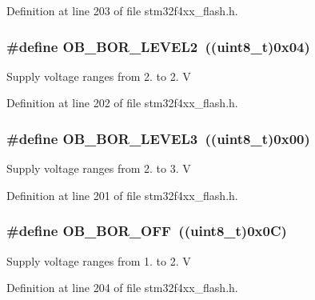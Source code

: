 Definition at line 203 of file stm32f4xx\-\_\-flash.\-h.

\hypertarget{group___f_l_a_s_h___b_o_r___reset___level_gad678e849fcf817f6ed2d837538e8ebc2}{
\subsubsection[{O\-B\-\_\-\-B\-O\-R\-\_\-\-L\-E\-V\-E\-L2}]{\setlength{\rightskip}{0pt plus 5cm}\#define O\-B\-\_\-\-B\-O\-R\-\_\-\-L\-E\-V\-E\-L2~((uint8\-\_\-t)0x04)}}\label{group___f_l_a_s_h___b_o_r___reset___level_gad678e849fcf817f6ed2d837538e8ebc2}
Supply voltage ranges from 2. to 2. V 

Definition at line 202 of file stm32f4xx\-\_\-flash.\-h.

\hypertarget{group___f_l_a_s_h___b_o_r___reset___level_ga3132b8202c0a345e9dd33d136714b046}{
\subsubsection[{O\-B\-\_\-\-B\-O\-R\-\_\-\-L\-E\-V\-E\-L3}]{\setlength{\rightskip}{0pt plus 5cm}\#define O\-B\-\_\-\-B\-O\-R\-\_\-\-L\-E\-V\-E\-L3~((uint8\-\_\-t)0x00)}}\label{group___f_l_a_s_h___b_o_r___reset___level_ga3132b8202c0a345e9dd33d136714b046}
Supply voltage ranges from 2. to 3. V 

Definition at line 201 of file stm32f4xx\-\_\-flash.\-h.

\hypertarget{group___f_l_a_s_h___b_o_r___reset___level_gaabc231cb1d05a94fe860f67bb5a37b12}{
\subsubsection[{O\-B\-\_\-\-B\-O\-R\-\_\-\-O\-F\-F}]{\setlength{\rightskip}{0pt plus 5cm}\#define O\-B\-\_\-\-B\-O\-R\-\_\-\-O\-F\-F~((uint8\-\_\-t)0x0\-C)}}\label{group___f_l_a_s_h___b_o_r___reset___level_gaabc231cb1d05a94fe860f67bb5a37b12}
Supply voltage ranges from 1. to 2. V 

Definition at line 204 of file stm32f4xx\-\_\-flash.\-h.

